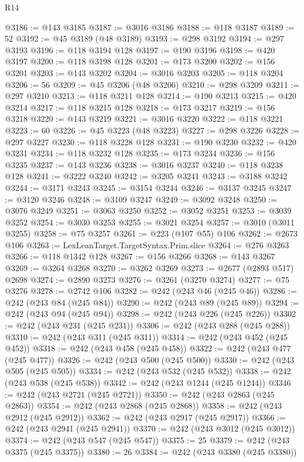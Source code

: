 \begin{lexlean}{R14}
\begin{coremodule}
{{{{{{{{{{{{{{{{{{{{{{{{{{{{{{{{{{{{{{{{{{{{{{{{{{{{{{{{{{{{{{{{{{{{{{{{{{{{{{{{{{@3186 := @143 @3185
@3187 := @3016 @3186
@3188 := @118 @3187
@3189 := 52
@3192 := @45 @3189 (@48 @3189)
@3193 := @298 @3192
@3194 := @297 @3193
@3196 := @118 @3194 @128
@3197 := @190 @3196
@3198 := @420 @3197
@3200 := @118 @3198 @128
@3201 := @173 @3200
@3202 := @156 @3201
@3203 := @143 @3202
@3204 := @3016 @3203
@3205 := @118 @3204
@3206 := 56
@3209 := @45 @3206 (@48 @3206)
@3210 := @298 @3209
@3211 := @297 @3210
@3213 := @118 @3211 @128
@3214 := @190 @3213
@3215 := @420 @3214
@3217 := @118 @3215 @128
@3218 := @173 @3217
@3219 := @156 @3218
@3220 := @143 @3219
@3221 := @3016 @3220
@3222 := @118 @3221
@3223 := 60
@3226 := @45 @3223 (@48 @3223)
@3227 := @298 @3226
@3228 := @297 @3227
@3230 := @118 @3228 @128
@3231 := @190 @3230
@3232 := @420 @3231
@3234 := @118 @3232 @128
@3235 := @173 @3234
@3236 := @156 @3235
@3237 := @143 @3236
@3238 := @3016 @3237
@3240 := @118 @3238 @128
@3241 := @3222 @3240
@3242 := @3205 @3241
@3243 := @3188 @3242
@3244 := @3171 @3243
@3245 := @3154 @3244
@3246 := @3137 @3245
@3247 := @3120 @3246
@3248 := @3109 @3247
@3249 := @3092 @3248
@3250 := @3076 @3249
@3251 := @3063 @3250
@3252 := @3052 @3251
@3253 := @3039 @3252
@3254 := @3030 @3253
@3255 := @3021 @3254
@3257 := @3010 (@3011 @3255)
@3258 := @75 @3257
@3261 := @223 (@107 @55) @106
@3262 := @2673 @106
@3263 := LexLeanTarget.TargetSyntax.Prim.slice
@3264 := @276 @3263
@3266 := @118 @1342 @128
@3267 := @156 @3266
@3268 := @143 @3267
@3269 := @3264 @3268
@3270 := @3262 @3269
@3273 := @2677 (@2893 @517) @2698
@3274 := @2890 @3273
@3276 := @3261 (@3270 @3274)
@3277 := @75 @3276
@3278 := @2742 @106
@3282 := @242 (@243 @46 (@245 @46))
@3286 := @242 (@243 @84 (@245 @84))
@3290 := @242 (@243 @89 (@245 @89))
@3294 := @242 (@243 @94 (@245 @94))
@3298 := @242 (@243 @226 (@245 @226))
@3302 := @242 (@243 @231 (@245 @231))
@3306 := @242 (@243 @288 (@245 @288))
@3310 := @242 (@243 @311 (@245 @311))
@3314 := @242 (@243 @452 (@245 @452))
@3318 := @242 (@243 @458 (@245 @458))
@3322 := @242 (@243 @477 (@245 @477))
@3326 := @242 (@243 @500 (@245 @500))
@3330 := @242 (@243 @505 (@245 @505))
@3334 := @242 (@243 @532 (@245 @532))
@3338 := @242 (@243 @538 (@245 @538))
@3342 := @242 (@243 @1244 (@245 @1244))
@3346 := @242 (@243 @2721 (@245 @2721))
@3350 := @242 (@243 @2863 (@245 @2863))
@3354 := @242 (@243 @2868 (@245 @2868))
@3358 := @242 (@243 @2912 (@245 @2912))
@3362 := @242 (@243 @2917 (@245 @2917))
@3366 := @242 (@243 @2941 (@245 @2941))
@3370 := @242 (@243 @3012 (@245 @3012))
@3374 := @242 (@243 @547 (@245 @547))
@3375 := 25
@3379 := @242 (@243 @3375 (@245 @3375))
@3380 := 26
@3384 := @242 (@243 @3380 (@245 @3380))
}}}}}}}}}}}}}}}}}}}}}}}}}}}}}}}}}}}}}}}}}}}}}}}}}}}}}}}}}}}}}}}}}}}}}}}}}}}}}}}}}}
\end{coremodule}
\end{lexlean}
